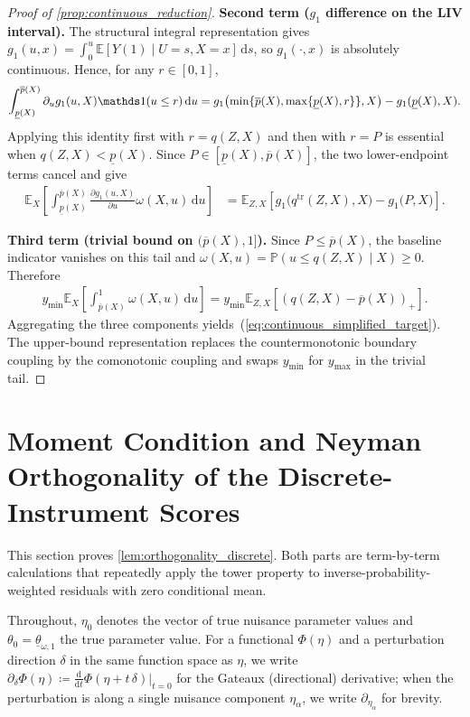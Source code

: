 \begin{proof}[Proof of \cref{prop:continuous_reduction}]
    \textbf{Second term ($g_1$ difference on the LIV interval).} The structural integral representation gives $g_1(u,x)=\int_0^u\mathbb E[Y(1)\mid U=s,X=x]\,\mathrm ds$, so $g_1(\cdot,x)$ is absolutely continuous. Hence, for any $r\in[0,1]$,
    \[
        \int_{\underline{p}(X)}^{\overline{p}(X)} \partial_u g_1(u,X)\indicator(u\le r)\,\mathrm du
        =g_1\!\left(\min\{\overline{p}(X),\max\{\underline{p}(X),r\}\},X\right)-g_1(\underline{p}(X),X).
    \]
    Applying this identity first with $r=q(Z,X)$ and then with $r=P$ is essential when $q(Z,X)<\underline{p}(X)$. Since $P\in[\underline{p}(X),\overline{p}(X)]$, the two lower-endpoint terms cancel and give
    \begin{align*}
       \mathbb{E}_{X}\!\left[ \int_{\underline{p}(X)}^{\overline{p}(X)} \frac{\partial g_1(u, X)}{\partial u} \omega(X,u)\, \mathrm{d}u \right]
        &= \mathbb{E}_{Z,X}\!\left[g_1\big(q^{\mathrm{tr}}(Z,X),X\big)-g_1\big(P,X\big)\right].
    \end{align*}

    \textbf{Third term (trivial bound on $(\overline{p}(X),1]$).} Since $P\le \overline{p}(X)$, the baseline indicator vanishes on this tail and $\omega(X,u)=\mathbb P(u\le q(Z,X)\mid X)\ge0$. Therefore
    \begin{align*}
        y_{\min} \mathbb{E}_{X}\!\left[\int_{\overline{p}(X)}^{1} \omega(X,u)\, \mathrm{d}u\right]
        =y_{\min}\mathbb E_{Z,X}\!\left[(q(Z,X)-\overline{p}(X))_+\right].
    \end{align*}
    Aggregating the three components yields~(\ref{eq:continuous_simplified_target}). The upper-bound representation replaces the countermonotonic boundary coupling by the comonotonic coupling and swaps $y_{\min}$ for $y_{\max}$ in the trivial tail.
\end{proof}

\section{Moment Condition and Neyman Orthogonality of the Discrete-Instrument Scores}\label{oa:orthogonality}

This section proves \cref{lem:orthogonality_discrete}. Both parts are term-by-term calculations that repeatedly apply the tower property to inverse-probability-weighted residuals with zero conditional mean.

Throughout, $\eta_0$ denotes the vector of true nuisance parameter values and $\theta_0 = \underline{\theta}_{\omega,1}$ the true parameter value. For a functional $\Phi(\eta)$ and a perturbation direction $\delta$ in the same function space as $\eta$, we write $\partial_\delta \Phi(\eta) \coloneqq \frac{\mathrm{d}}{\mathrm{d}t}\Phi(\eta + t\,\delta)\big|_{t=0}$ for the Gateaux (directional) derivative; when the perturbation is along a single nuisance component $\eta_\alpha$, we write $\partial_{\eta_\alpha}$ for brevity.

